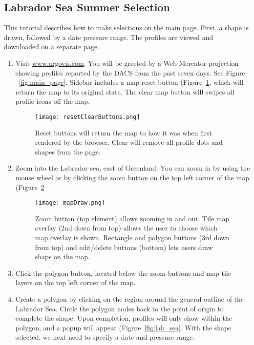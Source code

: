 \subsection{Labrador Sea Summer Selection}

This tutorial describes how to make selections on the main page. First, a shape is drawn, followed by a date pressure range. The profiles are viewed and downloaded on a separate page.

\begin{enumerate}
\item Visit \url{www.argovis.com}. You will be greeted by a Web Mercator projection showing profiles reported by the DACS from the past seven days. See Figure ~\ref{fig:main_page}. Sidebar includes a map reset button (Figure~\ref{fig:reset_clear_buttons}, which will return the map to its original state. The clear map button will swipes all profile icons off the map.

\begin{figure}[H]
\begin{minipage}{6in}
\centering
\texttt{[image: resetClearButtons.png]}
\caption{\label{fig:reset_clear_buttons} Reset buttons will return the map to how it was when first rendered by the browser. Clear will remove all profile dots and shapes from the page.}
\end{minipage}
\end{figure}

\item Zoom into the Labrador sea, east of Greenland. You can zoom in by using the mouse wheel or by clicking the zoom button on the top left corner of the map (Figure~\ref{fig:map_draw}

\begin{figure}[H]
\begin{minipage}{6in}
\centering
\texttt{[image: mapDraw.png]}
\caption{\label{fig:map_draw} Zoom button (top element) allows zooming in and out. Tile map overlay (2nd down from top) allows the user to choose which map overlay is shown. Rectangle and polygon buttons (3rd down from top) and edit/delete buttons (bottom) lets users draw shaps on the map.}
\end{minipage}
\end{figure}

\item Click the polygon button, located below the zoom buttons and map tile layers on the top left corner of the map.

\item Create a polygon by clicking on the region around the general outline of the Labrador Sea. Circle the polygon nodes back to the point of origin to complete the shape. Upon completion, profiles will only show within the polygon, and a popup will appear (Figure~\ref{fig:lab_sea}. With the shape selected, we next need to specify a date and pressure range.


\end{enumerate}

